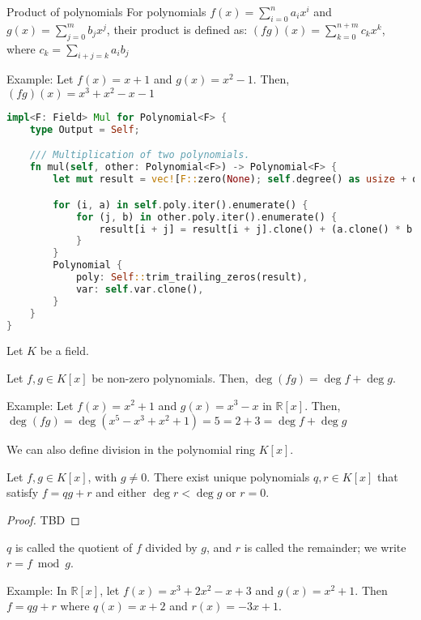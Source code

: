 \documentclass{article}
\begin{document}
\begin{definition}{Product of polynomials}{}
    For polynomials $f(x) = \sum_{i=0}^n a_i x^i$ and $g(x) = \sum_{j=0}^m b_j x^j$, their product is defined as:
    $(fg)(x) = \sum_{k=0}^{n+m} c_k x^k$, where $c_k = \sum_{i+j=k} a_i b_j$
\end{definition}

Example: Let $f(x) = x + 1$ and $g(x) = x^2 - 1$. Then, $(fg)(x) = x^3 + x^2 - x - 1$

\begin{lstlisting}[language=Rust, caption=Product of polynomials]
impl<F: Field> Mul for Polynomial<F> {
    type Output = Self;

    /// Multiplication of two polynomials.
    fn mul(self, other: Polynomial<F>) -> Polynomial<F> {
        let mut result = vec![F::zero(None); self.degree() as usize + other.degree() as usize + 1];

        for (i, a) in self.poly.iter().enumerate() {
            for (j, b) in other.poly.iter().enumerate() {
                result[i + j] = result[i + j].clone() + (a.clone() * b.clone());
            }
        }
        Polynomial {
            poly: Self::trim_trailing_zeros(result),
            var: self.var.clone(),
        }
    }
}
\end{lstlisting}

Let $K$ be a field.

\begin{lemma}{}{}
    Let $f, g \in K[x]$ be non-zero polynomials. Then, $\deg(fg) = \deg f + \deg g$.
\end{lemma}

Example: Let $f(x) = x^2 + 1$ and $g(x) = x^3 - x$ in $\mathbb{R}[x]$. Then, $\deg(fg) = \deg(x^5 - x^3 + x^2 + 1) = 5 = 2 + 3 = \deg f + \deg g$

We can also define division in the polynomial ring $K[x]$.

\begin{theorem}{}{}
    Let $f, g \in K[x]$, with $g \neq 0$. There exist unique polynomials $q, r \in K[x]$ that satisfy $f = qg + r$ and either $\deg r < \deg g$ or $r = 0$.
\end{theorem}

\begin{proof}
    TBD
\end{proof}

$q$ is called the quotient of $f$ divided by $g$, and $r$ is called the remainder; we write $r = f \bmod g$.

Example: In $\mathbb{R}[x]$, let $f(x) = x^3 + 2x^2 - x + 3$ and $g(x) = x^2 + 1$.  Then $f = qg + r$ where $q(x) = x + 2$ and $r(x) = -3x + 1$.
\end{document}
